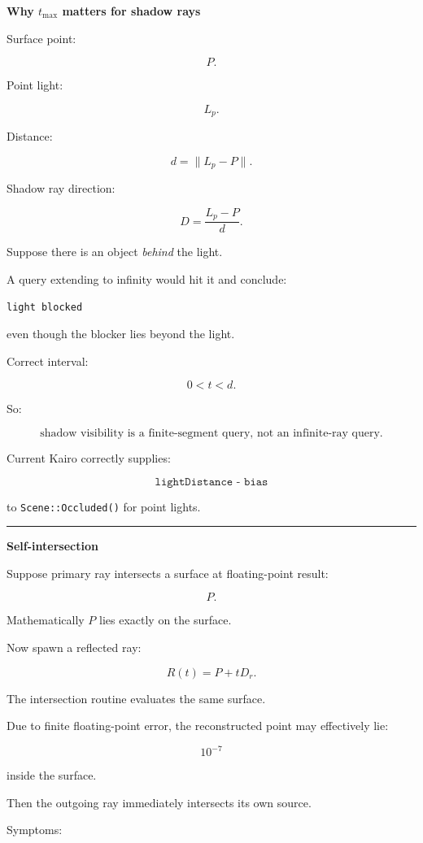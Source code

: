 \textbf{Why \(t_{\max}\) matters for shadow rays}

Surface point:

\[
P.
\]

Point light:

\[
L_p.
\]

Distance:

\[
d=
\|L_p-P\|.
\]

Shadow ray direction:

\[
D=
\frac{L_p-P}{d}.
\]

Suppose there is an object \emph{behind} the light.

A query extending to infinity would hit it and conclude:

\begin{verbatim}
light blocked
\end{verbatim}

even though the blocker lies beyond the light.

Correct interval:

\[
0<t<d.
\]

So:

\[
\boxed{
\text{shadow visibility is a finite-segment query, not an infinite-ray query}.
}
\]

Current Kairo correctly supplies:

\[
\texttt{lightDistance - bias}
\]

to \texttt{Scene::Occluded()} for point lights.

\begin{center}\rule{0.5\linewidth}{0.5pt}\end{center}

\textbf{Self-intersection}

Suppose primary ray intersects a surface at floating-point result:

\[
P.
\]

Mathematically \(P\) lies exactly on the surface.

Now spawn a reflected ray:

\[
R(t)=P+tD_r.
\]

The intersection routine evaluates the same surface.

Due to finite floating-point error, the reconstructed point may effectively lie:

\[
10^{-7}
\]

inside the surface.

Then the outgoing ray immediately intersects its own source.

Symptoms:

